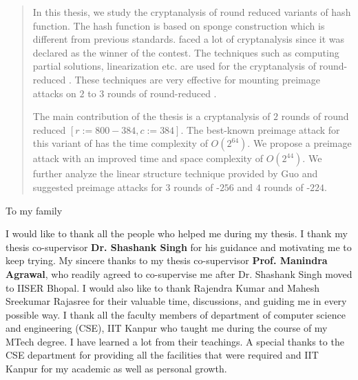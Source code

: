 \begin{abstract}
	
	In this thesis, we study the cryptanalysis of round reduced variants of
	\KECCAK{} hash function. The \KECCAK{} hash function is based on sponge
	construction which is different from previous \SHA{} standards. 
	\KECCAK{} faced a lot of cryptanalysis since it was declared as the
	winner of the  contest. The techniques such as computing partial
	solutions,  linearization etc. are used for the cryptanalysis of
	round-reduced \KECCAK{}. These techniques are very effective for
	mounting preimage attacks on $2$ to $3$ rounds of round-reduced \KECCAK{}. 
	
	The main contribution of the thesis is a cryptanalysis of $2$ rounds of 
	round reduced
	\KECCAK{}$[r:=800-384, c:=384]$. 
	The best-known preimage
	attack for this variant of \KECCAK{} has the time complexity of
	$O(2^{64})$. We propose a preimage attack with an improved time and
	space complexity of $O(2^{44})$. We further analyze the linear structure
	technique provided by Guo \etal and suggested preimage attacks for $3$ rounds of \KECCAK-$256$ and $4$ rounds of \KECCAK-$224$.
\end{abstract}

\begin{dedication}
	To my family
\end{dedication}

\begin{acknowledgments}
	
	I would like to thank all the people who helped me during my thesis. I thank my thesis co-supervisor \textbf{Dr. Shashank Singh} for his guidance and motivating me to keep trying.
	My sincere thanks to my thesis co-supervisor \textbf{Prof. Manindra Agrawal}, who readily agreed to co-supervise me after Dr. Shashank Singh moved to IISER Bhopal. 
	I would also like to thank Rajendra Kumar and Mahesh Sreekumar Rajasree
	for their valuable time, discussions, and guiding me in every possible
	way. I thank all the faculty members of department of computer science
	and engineering (CSE), IIT Kanpur who taught me during the course of my
	MTech degree. I have learned a lot from their teachings. A special
	thanks to the CSE department for providing all the facilities that were required and  IIT Kanpur for my academic as well as personal growth.
\end{acknowledgments}

\tableofcontents
\listoftables

\cleardoublepage
{} \label{listoffig}
\listoffigures

\cleardoublepage{} %
